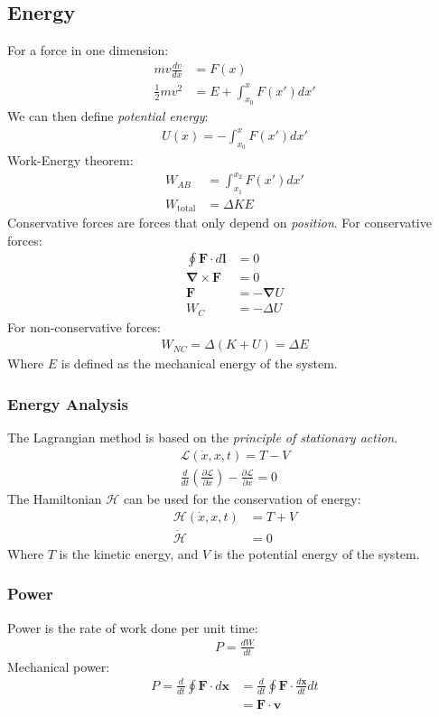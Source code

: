 \documentclass[11pt]{article}
\newcommand{\Lagr}{\mathcal{L}}					%
\newcommand{\Hami}{\mathcal{H}}					%
\newcommand{\ve}[1]{\ensuremath{\bm{#1}}}			%
\newcommand{\pd}[2]{
\ensuremath{ \frac{\partial #1}{\partial #2} }}			%
\begin{document}
\begin{multicols*}{3}
\subsection{Energy}
For a force in one dimension:
	\begin{align*}
	mv\frac{dv}{dx} &= F(x) \\
	\frac{1}{2}mv^2 &= E + \int_{x_0}^{x} F(x') dx'
	\end{align*}
We can then define \emph{potential energy}: 
	\begin{align*}
	U(x) = - \int_{x_0}^x F(x') dx' 
	\end{align*}
Work-Energy theorem:
	\begin{align*}
	W_{AB} &= \int_{x_1}^{x_2} F(x') dx' \\
	W_{\text{total}} &= \Delta KE
	\end{align*}
Conservative forces are forces that only depend on {\em position}. For conservative forces:
	\begin{align*}
	\oint \ve{F} \cdot d\ve{l} &= 0 \\
	\ve{\nabla} \times \ve{F} &= 0 \\
	\ve{F} &= - \ve{\nabla} U \\
	W_{C} &= -\Delta U
	\end{align*}
For non-conservative forces:
	\begin{align*}
	W_{NC} = \Delta(K+U) = \Delta E
	\end{align*}
Where $E$ is defined as the mechanical energy of the system.
\subsubsection{Energy Analysis}
The Lagrangian method is based on the \emph{principle of stationary action}.
	\begin{align*}
	\Lagr(\dot{x},x,t) = T - V \\
	\frac{d}{dt}\left( \pd{\Lagr}{\dot{x}} \right) - \pd{\Lagr}{x} = 0
	\end{align*}
The Hamiltonian $\Hami$ can be used for the conservation of energy:
	\begin{align*}
	\Hami(\dot{x},x,t) &= T + V \\
	\dot{\Hami}&=0
	\end{align*}
Where $T$ is the kinetic energy, and $V$ is the potential energy of the system.
\subsubsection{Power}
Power is the rate of work done per unit time:
	\begin{align*}
	P=\frac{dW}{dt}
	\end{align*}
Mechanical power:
	\begin{align*}
	P=\frac{d}{dt}\oint \ve{F} \cdot d\ve{x}&=\frac{d}{dt}\oint \ve{F} \cdot \frac{d\ve{x}}{dt} dt\\
	&=\ve{F} \cdot \ve{v}
	\end{align*}

\end{multicols*}
\end{document}
